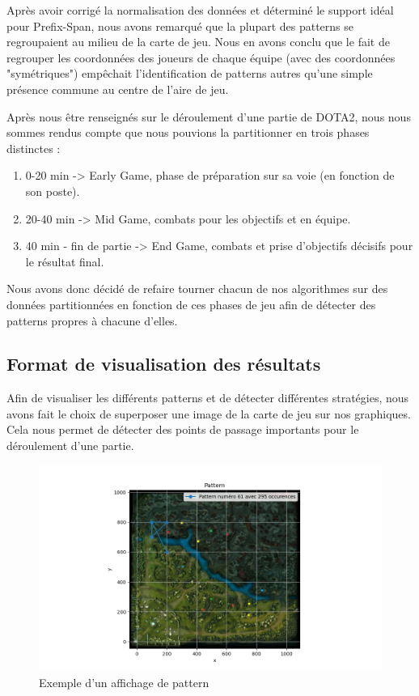 \documentclass{article}
\begin{document}
            Après avoir corrigé la normalisation des données et déterminé le support idéal pour Prefix-Span, nous avons remarqué que la plupart des patterns se regroupaient au milieu de la carte de jeu. Nous en avons conclu que le fait de regrouper les coordonnées des joueurs de chaque équipe (avec des coordonnées "symétriques") empêchait l’identification de patterns autres qu’une simple présence commune au centre de l’aire de jeu.
            

            Après nous être renseignés sur le déroulement d’une partie de DOTA2, nous nous sommes rendus compte que nous pouvions la partitionner en trois phases distinctes :
            \begin{enumerate}
            \item 0-20 min -> Early Game, phase de préparation sur sa voie (en fonction de son poste).
            \item 20-40 min -> Mid Game, combats pour les objectifs et en équipe.
            \item 40 min - fin de partie -> End Game, combats et prise d’objectifs décisifs pour le résultat final.
            \end{enumerate}
            Nous avons donc décidé de refaire tourner chacun de nos algorithmes sur des données partitionnées en fonction de ces phases de jeu afin de détecter des patterns propres à chacune d’elles.
            
        \subsection{Format de visualisation des résultats}
        Afin de visualiser les différents patterns et de détecter différentes stratégies, nous avons fait le choix de superposer une image de la carte de jeu sur nos graphiques. Cela nous permet de détecter des points de passage importants pour le déroulement d’une partie.

        \begin{figure}[htbp]
            \centering
            \includegraphics[scale=0.5]{img/prefixEarly.png}
            \caption{Exemple d'un affichage de pattern}
            \label{test_mdl}
        \end{figure}
    
\end{document}
